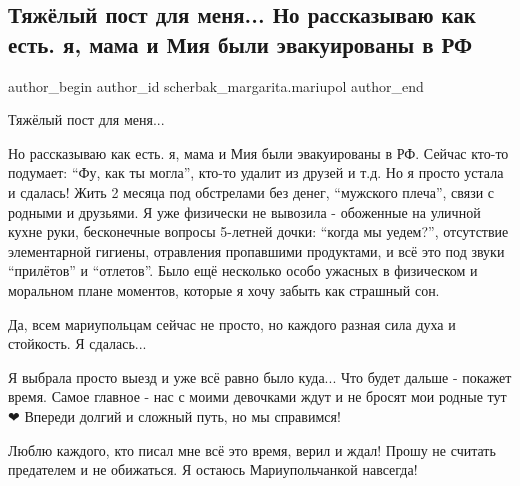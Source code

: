  
 
 
 
 

\subsection{Тяжёлый пост для меня...  Но рассказываю как есть. я, мама и Мия были эвакуированы в РФ}
\label{sec:23_04_2022.fb.scherbak_margarita.mariupol.1.tyazhyolii_post_dlya}

\ifcmt
 author_begin
   author_id scherbak_margarita.mariupol
 author_end
\fi

Тяжёлый пост для меня... 

Но рассказываю как есть. я, мама и Мия были эвакуированы в РФ. Сейчас кто-то
подумает: \enquote{Фу, как ты могла}, кто-то удалит из друзей и т.д. Но я просто устала
и сдалась! Жить 2 месяца под обстрелами без денег, \enquote{мужского плеча}, связи с
родными и друзьями. Я уже физически не вывозила - обоженные на уличной кухне
руки, бесконечные вопросы 5-летней дочки: \enquote{когда мы уедем?}, отсутствие
элементарной гигиены, отравления пропавшими продуктами, и всё это под звуки
\enquote{прилётов} и \enquote{отлетов}. Было ещё несколько особо ужасных в физическом и
моральном плане моментов, которые я хочу забыть как страшный сон. 

Да, всем мариупольцам сейчас не просто, но каждого разная сила духа и
стойкость. Я сдалась... 

Я выбрала просто выезд и уже всё равно было куда... Что будет дальше - покажет
время. Самое главное - нас с моими девочками ждут и не бросят мои родные тут ❤
Впереди долгий и сложный путь, но мы справимся! 

Люблю каждого, кто писал мне всё это время, верил и ждал! Прошу не считать
предателем и не обижаться. Я остаюсь Мариупольчанкой навсегда!

